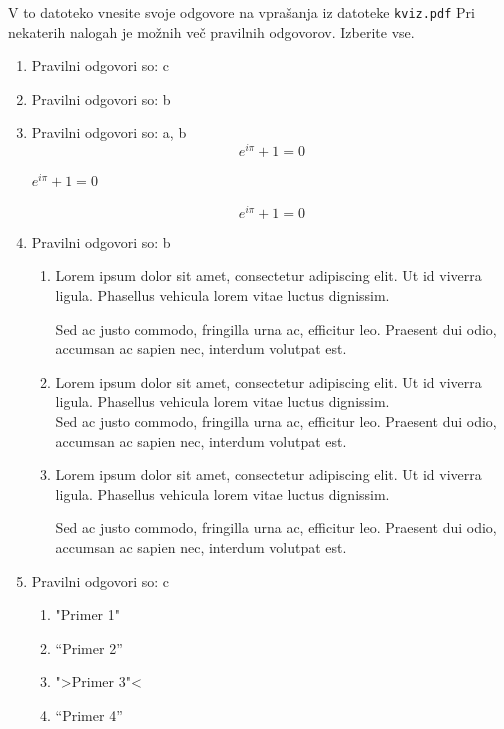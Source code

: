 \documentclass[11pt]{article}
\begin{document}
V to datoteko vnesite svoje odgovore na vprašanja iz datoteke \texttt{kviz.pdf}
Pri nekaterih nalogah je možnih več pravilnih odgovorov. Izberite vse.

\begin{enumerate}
    \item Pravilni odgovori so: c %
    
    \item Pravilni odgovori so: b%
    
    \item Pravilni odgovori so: a, b %
      \[ e^{i \pi} + 1 = 0 \]
      \begin{center}
          \( e^{i \pi} + 1 = 0 \)
      \end{center}
      \begin{equation*}
          e^{i \pi} + 1 = 0
      \end{equation*}

    \item Pravilni odgovori so: b %
        \begin{enumerate}
            \item {
Lorem ipsum dolor sit amet, consectetur adipiscing 
elit. Ut id viverra ligula. Phasellus vehicula lorem 
vitae luctus dignissim. 
                
Sed ac justo commodo, fringilla urna ac, efficitur 
leo. Praesent dui odio, accumsan ac sapien nec, 
interdum volutpat est. 
            }
            \item {
Lorem ipsum dolor sit amet, consectetur adipiscing 
elit. Ut id viverra ligula. Phasellus vehicula lorem 
vitae luctus dignissim. \\
Sed ac justo commodo, fringilla urna ac, efficitur 
leo. Praesent dui odio, accumsan ac sapien nec, 
interdum volutpat est.             }
            \item {
Lorem ipsum dolor sit amet, consectetur adipiscing 
elit. Ut id viverra ligula. Phasellus vehicula lorem 
vitae luctus dignissim. \par
Sed ac justo commodo, fringilla urna ac, efficitur 
leo. Praesent dui odio, accumsan ac sapien nec, 
interdum volutpat est.             }
        \end{enumerate}
    
      \item Pravilni odgovori so: c %
        \begin{enumerate}
          \item "Primer 1"
          \item ``Primer 2''
          \item ">Primer 3"<
          \item "`Primer 4"'
        \end{enumerate}


\end{enumerate}
\end{document}
